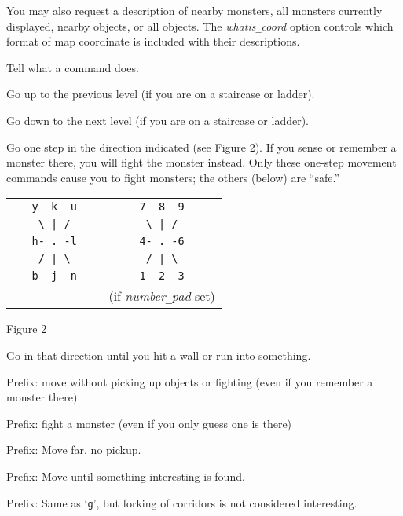 You may also request a description of nearby monsters,
all monsters currently displayed, nearby objects, or all objects.
The
{\it whatis\verb+_+coord\/}
option controls which format of map coordinate is included with their
descriptions.
\item[\tb{\&}]
Tell what a command does.
\item[\tb{<}]
Go up to the previous level (if you are on a staircase or ladder).
\item[\tb{>}]
Go down to the next level (if you are on a staircase or ladder).
\item[\tb{[yuhjklbn]}]
Go one step in the direction indicated (see Figure 2).  If you sense
or remember
a monster there, you will fight the monster instead.  Only these
one-step movement commands cause you to fight monsters; the others
(below) are ``safe.''
\begin{center}
\begin{tabular}{cc}
\verb+   y  k  u   + & \verb+   7  8  9   +\\
\verb+    \ | /    + & \verb+    \ | /    +\\
\verb+   h- . -l   + & \verb+   4- . -6   +\\
\verb+    / | \    + & \verb+    / | \    +\\
\verb+   b  j  n   + & \verb+   1  2  3   +\\
                     & (if {\it number\verb+_+pad\/} set)
\end{tabular}
\end{center}
\begin{center}
Figure 2
\end{center}
\item[\tb{[YUHJKLBN]}]
Go in that direction until you hit a wall or run into something.
\item[\tb{m[yuhjklbn]}]
Prefix:  move without picking up objects or fighting (even if you remember
a monster there)
\item[\tb{F[yuhjklbn]}]
Prefix:  fight a monster (even if you only guess one is there)
\item[\tb{M[yuhjklbn]}]
Prefix:  Move far, no pickup.
\item[\tb{g[yuhjklbn]}]
Prefix:  Move until something interesting is found.
\item[\tb{G[yuhjklbn] {\rm or} <CONTROL->[yuhjklbn]}]
Prefix:  Same as `{\tt g}', but forking of corridors is not considered
interesting.
\item[\tb{_}]
